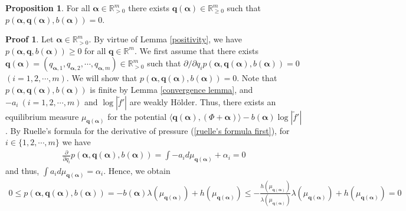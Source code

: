 \documentclass{article}
\theoremstyle{definition}
\newtheorem{prop}[thm]{Proposition}
\newtheorem*{pf}{Proof}
\begin{document}
\begin{prop}\label{important lemma}
For all $\boldsymbol{\alpha}\in \mathbb{R}^m_{>0}$ there exists $\boldsymbol{q}(\boldsymbol{\alpha})\in\mathbb{R}_{\geq 0}^m$ such that $p(\boldsymbol{\alpha},\boldsymbol{q}(\boldsymbol{\alpha}),b(\boldsymbol{\alpha}))=0$.
\end{prop}



\begin{pf}
Let $\boldsymbol{\alpha}\in \mathbb{R}^m_{>0}$. By virtue of Lemma \ref{positivity}, we have 
    $p(\boldsymbol{\alpha},\boldsymbol{q},b(\boldsymbol{\alpha}))  \geq 0$
 for all $\boldsymbol{q} \in \mathbb{R}^m$. We first assume that 
   there exists $\boldsymbol{q}(\boldsymbol{\alpha})=(q_{\boldsymbol{\alpha},1},q_{\boldsymbol{\alpha},2},\cdots,q_{\boldsymbol{\alpha},m}) \in \mathbb{R}^m_{>0}$ such that
     ${\partial}/{\partial q_i}p(\boldsymbol{\alpha},\boldsymbol{q}(\boldsymbol{\alpha}),b(\boldsymbol{\alpha}))=0$ $(i=1,2,\cdots,m)$. We will show that 
     $p(\boldsymbol{\alpha},\boldsymbol{q}(\boldsymbol{\alpha}),b(\boldsymbol{\alpha}))=0.$
  Note that $p(\boldsymbol{\alpha},\boldsymbol{q}(\boldsymbol{\alpha}),b(\boldsymbol{\alpha}))$ is finite by Lemma \ref{convergence lemma}, and $-a_i\ (i=1,2,\cdots,m)$ and $\log |\tilde f'|$ are weakly H\"older. Thus, there exists an equilibrium measure $\mu_{\boldsymbol{q}(\boldsymbol{\alpha})}$ for the potential $\langle \boldsymbol{q}(\boldsymbol{\alpha}), (\Phi+\boldsymbol{\alpha}) \rangle -b(\boldsymbol{\alpha})\log|\tilde f'|$. By Ruelle's formula for the derivative of pressure (\ref{ruelle's formula first}), for $i\in \lbrace1,2,\cdots,m\rbrace$ we have
\begin{align}\nonumber
     \frac{\partial}{\partial q_i}p(\boldsymbol{\alpha},\boldsymbol{q}(\boldsymbol{\alpha}),b(\boldsymbol{\alpha}))=\int-a_id\mu_{\boldsymbol{q}(\boldsymbol{\alpha})}+\alpha_i=0 
 \end{align}
 and thus,  
 $\int a_i d\mu_{\boldsymbol{q}(\boldsymbol{\alpha})}=\alpha_i.$
 Hence, we obtain 
\begin{align}\nonumber
0\leq p(\boldsymbol{\alpha},\boldsymbol{q}(\boldsymbol{\alpha}),b(\boldsymbol{\alpha}))= -b(\boldsymbol{\alpha})\lambda(\mu_{\boldsymbol{q}(\boldsymbol{\alpha})})+h(\mu_{\boldsymbol{q}(\boldsymbol{\alpha})})
\leq -\frac{h(\mu_{\boldsymbol{q}(\boldsymbol{\alpha})})}{\lambda(\mu_{\boldsymbol{q}(\boldsymbol{\alpha})})}\lambda(\mu_{\boldsymbol{q}(\boldsymbol{\alpha})}) + h(\mu_{\boldsymbol{q}(\boldsymbol{\alpha})}) = 0
\end{align}

\end{pf}
\end{document}
